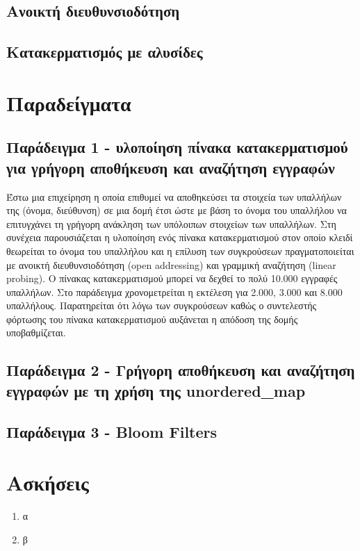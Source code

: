 \subsection{Ανοικτή διευθυνσιοδότηση}

\subsection{Κατακερματισμός με αλυσίδες}

\section{Παραδείγματα}

\subsection{Παράδειγμα 1 - υλοποίηση πίνακα κατακερματισμού για γρήγορη αποθήκευση και αναζήτηση εγγραφών}
Έστω μια επιχείρηση η οποία επιθυμεί να αποθηκεύσει τα στοιχεία των υπαλλήλων της (όνομα, διεύθυνση) σε μια δομή έτσι ώστε με βάση το όνομα του υπαλλήλου να επιτυγχάνει τη γρήγορη ανάκληση των υπόλοιπων στοιχείων των υπαλλήλων. Στη συνέχεια παρουσιάζεται η υλοποίηση ενός πίνακα κατακερματισμού στον οποίο κλειδί θεωρείται το όνομα του υπαλλήλου και η επίλυση των συγκρούσεων πραγματοποιείται με ανοικτή διευθυνσιοδότηση (open addressing) και γραμμική αναζήτηση (linear probing). Ο πίνακας κατακερματισμού μπορεί να δεχθεί το πολύ 10.000 εγγραφές υπαλλήλων. Στο παράδειγμα χρονομετρείται η εκτέλεση για 2.000, 3.000 και 8.000 υπαλλήλους. Παρατηρείται ότι λόγω των συγκρούσεων καθώς ο συντελεστής φόρτωσης του πίνακα κατακερματισμού αυξάνεται η απόδοση της δομής υποβαθμίζεται.

\subsection{Παράδειγμα 2 - Γρήγορη αποθήκευση και αναζήτηση εγγραφών με τη χρήση της unordered\_map}

\subsection{Παράδειγμα 3 - Bloom Filters}


\section{Ασκήσεις}
\begin{enumerate}
\item α
\item β
\end{enumerate}

\begin{thebibliography}{9}

\end{thebibliography}


